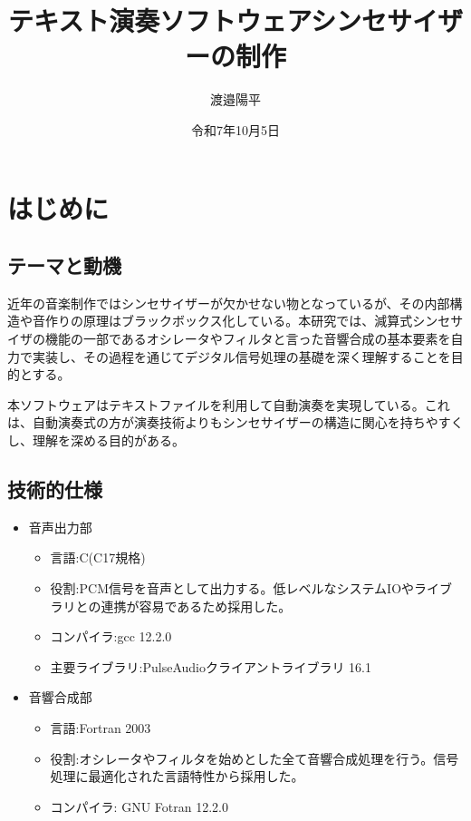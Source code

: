 \documentclass[dvipdfmx]{ujarticle}
\title{テキスト演奏ソフトウェアシンセサイザーの制作}
\author{渡邉陽平}
\date{令和7年10月5日}
\begin{document}
\maketitle

\section{はじめに}
\subsection{テーマと動機}
近年の音楽制作ではシンセサイザーが欠かせない物となっているが、その内部構造や音作りの原理はブラックボックス化している。本研究では、減算式シンセサイザの機能の一部であるオシレータやフィルタと言った音響合成の基本要素を自力で実装し、その過程を通じてデジタル信号処理の基礎を深く理解することを目的とする。\par
本ソフトウェアはテキストファイルを利用して自動演奏を実現している。これは、自動演奏式の方が演奏技術よりもシンセサイザーの構造に関心を持ちやすくし、理解を深める目的がある。
\subsection{技術的仕様}
\begin{itemize}
  \setlength{\itemsep}{-0.5mm}
  \setlength{\parskip}{0mm}
\item 音声出力部
  \begin{itemize}
  \setlength{\itemsep}{-0.5mm}
  \setlength{\parskip}{0mm}
  \item 言語:C(C17規格)
  \item 役割:PCM信号を音声として出力する。低レベルなシステムIOやライブラリとの連携が容易であるため採用した。
  \item コンパイラ:gcc 12.2.0
  \item 主要ライブラリ:PulseAudioクライアントライブラリ 16.1
  \end{itemize}
\item 音響合成部
  \begin{itemize}
  \setlength{\itemsep}{-0.5mm}
  \setlength{\parskip}{0mm}
  \item 言語:Fortran 2003
  \item 役割:オシレータやフィルタを始めとした全て音響合成処理を行う。信号処理に最適化された言語特性から採用した。
  \item コンパイラ: GNU Fotran 12.2.0
  \end{itemize}
\end{itemize}
\end{document}
